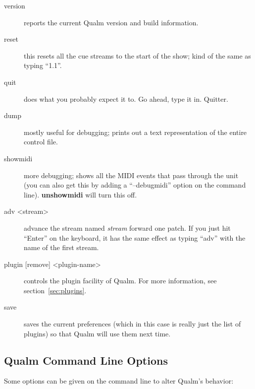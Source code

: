 \documentclass{article}
\newcommand{\q}{{\textsf{Qualm}}\xspace}
\begin{document}
\begin{description}
\item[version] reports the current \q version and build
      information.

\item[reset] this resets all the cue streams to the start of the
      show; kind of the same as typing ``1.1''.

\item[quit] does what you probably expect it to.  Go ahead, type it
      in.  Quitter.

\item[dump] mostly useful for debugging; prints out a text
      representation of the entire control file.

\item[showmidi] more debugging; shows all the MIDI events that pass
      through the unit (you can also get this by adding a ``--debugmidi''
      option on the command line).  {\bf unshowmidi} will turn this
      off.

\item[adv <stream>] advance the stream named {\em stream}
      forward one patch.  If you just hit ``Enter'' on the keyboard,
      it has the same effect as typing ``adv'' with the name of the
      first stream.

\item[plugin {[remove]} <plugin-name>] controls
      the plugin facility of \q.  For more information, see
      section~\ref{sec:plugins}.

\item[save] saves the current preferences (which in this case is
      really just the list of plugins) so that \q will use them next
      time.
\end{description}

\subsection{\q Command Line Options}

Some options can be given on the command line to alter \q's behavior:
\end{document}
